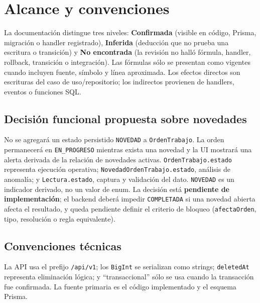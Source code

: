 \section{Alcance y convenciones}

La documentación distingue tres niveles: \textbf{Confirmada} (visible en código, Prisma, migración o handler registrado), \textbf{Inferida} (deducción que no prueba una escritura o transición) y \textbf{No encontrada} (la revisión no halló fórmula, handler, rollback, transición o integración). Las fórmulas sólo se presentan como vigentes cuando incluyen fuente, símbolo y línea aproximada. Los efectos directos son escrituras del caso de uso/repositorio; los indirectos provienen de handlers, eventos o funciones SQL.

\subsection{Decisión funcional propuesta sobre novedades}
No se agregará un estado persistido \texttt{NOVEDAD} a \texttt{OrdenTrabajo}. La orden permanecerá en \texttt{EN\_PROGRESO} mientras exista una novedad y la UI mostrará una alerta derivada de la relación de novedades activas. \texttt{OrdenTrabajo.estado} representa ejecución operativa; \texttt{NovedadOrdenTrabajo.estado}, análisis de anomalía; y \texttt{Lectura.estado}, captura y validación del dato. \texttt{NOVEDAD} es un indicador derivado, no un valor de enum. La decisión está \textbf{pendiente de implementación}; el backend deberá impedir \texttt{COMPLETADA} si una novedad abierta afecta el resultado, y queda pendiente definir el criterio de bloqueo (\texttt{afectaOrden}, tipo, resolución o regla equivalente).

\subsection{Convenciones técnicas}
La API usa el prefijo \texttt{/api/v1}; los \texttt{BigInt} se serializan como strings; \texttt{deletedAt} representa eliminación lógica; y ``transaccional'' sólo se usa cuando la transacción fue confirmada. La fuente primaria es el código implementado y el esquema Prisma.
